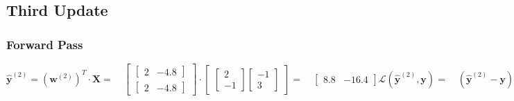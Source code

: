 \documentclass[addpoints]{exam}
\begin{document}
\subsection{Third Update}
\subsubsection{Forward Pass}
\begin{subequations}
	\begin{equation}
		\hat{\textbf{y}}^{(2)} = (\textbf{w}^{(2)})^{T}\cdot \textbf{X} = \quad \begin{bmatrix}
			\begin{bmatrix}
				2& -4.8
			\end{bmatrix} \\
			\begin{bmatrix}
				2& -4.8
			\end{bmatrix}
		\end{bmatrix} \cdot \begin{bmatrix}
			\begin{bmatrix}
				2 \\-1
				
			\end{bmatrix} \begin{bmatrix}
				-1 \\3
				
			\end{bmatrix} 
		\end{bmatrix}=  \quad \begin{bmatrix}
			8.8&-16.4
		\end{bmatrix}
	\end{equation}
	\begin{equation}
		\mathscr{L}(\hat{\textbf{y}}^{(2)},\textbf{y}) = \quad (\hat{\textbf{y}}^{(2)} - \textbf{y})^{2} =\quad( \begin{bmatrix}
			8.8&-16.4 
		\end{bmatrix} - \begin{bmatrix}
			3&1 
		\end{bmatrix}) ^{2} = \quad \begin{bmatrix}
			33.64&302.76
		\end{bmatrix}
	\end{equation}
\end{subequations}
\end{document}
